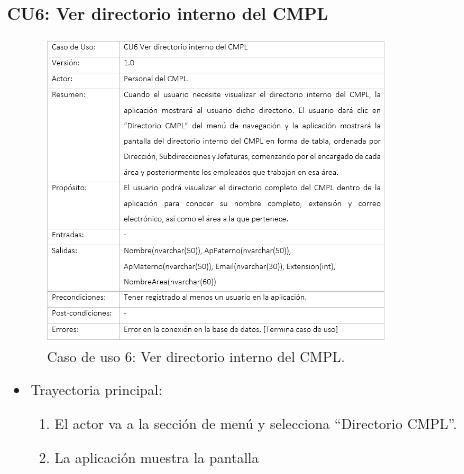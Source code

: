 		\subsubsection{CU6: Ver directorio interno del CMPL}
			\begin{figure}[htbp!]
				\centering
					\includegraphics[width=0.8\textwidth]{images/CU/CU6}
					\caption{Caso de uso 6: Ver directorio interno del CMPL.}
				\label{Tabla}
			\end{figure}
			
			\begin{itemize}
				\item Trayectoria principal:
					\begin{enumerate}
						\item El actor va a la sección de menú y selecciona ``Directorio CMPL''.
						\item La aplicación muestra la pantalla 
					\end{enumerate}
			\end{itemize}
			
